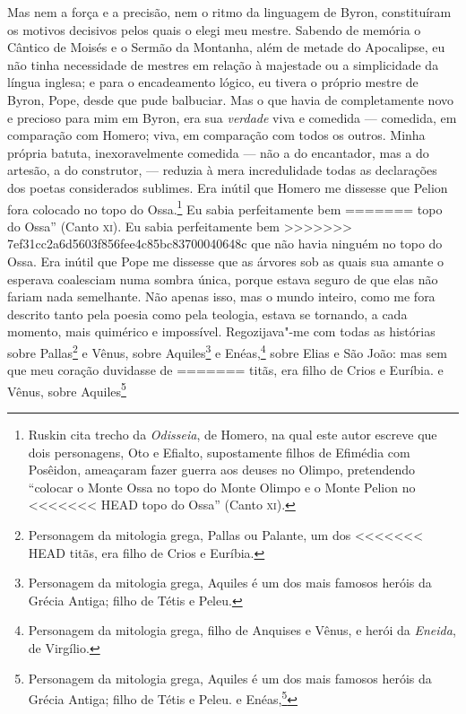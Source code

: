 {{{{{{{{{{{{{{{{{{{{{{{{{{{{{{{{{{{{{{{{{{{{{{{{{{{%
Mas nem a força e a precisão, nem o ritmo da linguagem de Byron,
constituíram os motivos decisivos pelos quais o elegi meu mestre.
Sabendo de memória o Cântico de Moisés e o Sermão da Montanha, além de
metade do Apocalipse, eu não tinha necessidade de mestres em relação à
majestade ou a simplicidade da língua inglesa; e para o encadeamento
lógico, eu tivera o próprio mestre de Byron, Pope, desde que pude
balbuciar. Mas o que havia de completamente novo e precioso para mim em
Byron, era sua \textit{verdade} viva e comedida --- comedida, em comparação
com Homero; viva, em comparação com todos os outros. Minha própria
batuta, inexoravelmente comedida --- não a do encantador, mas a do
artesão, a do construtor, --- reduzia à mera incredulidade todas as
declarações dos poetas considerados sublimes. Era inútil que Homero me
dissesse que Pelion fora colocado no topo do Ossa.\footnote{Ruskin cita
  trecho da \textit{Odisseia}, de Homero, na qual este autor escreve
  que dois personagens, Oto e Efialto, supostamente filhos de Efimédia com
  Posêidon, ameaçaram fazer guerra aos deuses no Olimpo, pretendendo
  ``colocar o Monte Ossa no topo do Monte Olimpo e o Monte Pelion no
<<<<<<< HEAD
  topo do Ossa'' (Canto \textsc{xi}).} Eu sabia perfeitamente bem
=======
  topo do Ossa'' (Canto \textsc{xi}).  Eu sabia perfeitamente bem
>>>>>>> 7ef31cc2a6d5603f856fee4c85bc83700040648c
que não havia ninguém no topo do Ossa. Era inútil que Pope me dissesse
que as árvores sob as quais sua amante o esperava coalesciam numa sombra
única, porque estava seguro de que elas não fariam nada semelhante. Não
apenas isso, mas o mundo inteiro, como me fora descrito tanto pela
poesia como pela teologia, estava se tornando, a cada momento, mais
quimérico e impossível. Regozijava"-me com todas as histórias sobre
Pallas\footnote{Personagem da mitologia grega, Pallas ou Palante, um dos
<<<<<<< HEAD
  titãs, era filho de Crios e Euríbia.} e Vênus, sobre
Aquiles\footnote{Personagem da mitologia grega, Aquiles é um dos mais
  famosos heróis da Grécia Antiga; filho de Tétis e Peleu.} e Enéas,\footnote{Personagem da mitologia grega, filho de
  Anquises e Vênus, e herói da \textit{Eneida}, de Virgílio.} sobre Elias e São João: mas sem que meu coração duvidasse de
=======
  titãs, era filho de Crios e Euríbia.  e Vênus, sobre
Aquiles\footnote{Personagem da mitologia grega, Aquiles é um dos mais
  famosos heróis da Grécia Antiga; filho de Tétis e Peleu.  e Enéas,\footnote{Personagem da mitologia grega, filho de
  Anquises e Vênus, e herói da \textit{Eneida}, de Virgílio.  sobre Elias e São João: mas sem que meu coração duvidasse de
>>>>>>> 7ef31cc2a6d5603f856fee4c85bc83700040648c
serem eles espíritos reais de sabedoria e beleza, ou que tivessem sido
heróis invencíveis e profetas inspirados, já percebia, com crescente e
fatal tristeza, que não havia prova da existência de nenhum deles --- que
para \textit{mim} eles não eram nem divindades"-guias nem mestres
proféticos; e que as histórias poéticas, sejam deste mundo ou do
próximo, eram para mim como as palavras de Pedro a seus discípulos mudos
--- ''são apenas fábulas; não acreditem nelas''.

}}}}}}}}}}}}}}}}}}}}}}}}}}}}}}}}}}}}}}}}}}}}}}}}}}}}}
